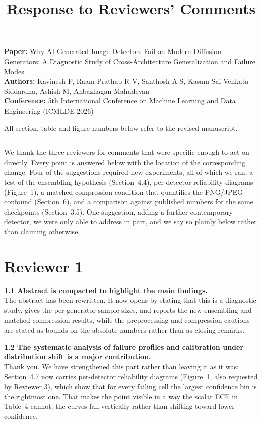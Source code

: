 \documentclass[11pt]{article}
\title{\vspace{-2.2em}Response to Reviewers' Comments}
\author{}
\date{}
\begin{document}
\maketitle
\vspace{-3.2em}

\noindent\textbf{Paper:} Why AI-Generated Image Detectors Fail on Modern
Diffusion Generators: A Diagnostic Study of Cross-Architecture
Generalization and Failure Modes\\
\textbf{Authors:} Kavinesh P, Raam Prathap R V, Santhosh A S, Kasam Sai
Venkata Siddardha, Ashish M, Anbazhagan Mahadevan\\
\textbf{Conference:} 5th International Conference on Machine Learning and
Data Engineering (ICMLDE 2026)

\vspace{6pt}
\noindent All section, table and figure numbers below refer to the revised
manuscript.

\vspace{4pt}
\hrule
\vspace{10pt}

We thank the three reviewers for comments that were specific enough to act
on directly. Every point is answered below with the location of the
corresponding change. Four of the suggestions required new experiments,
all of which we ran: a test of the ensembling hypothesis
(Section~4.4), per-detector reliability diagrams
(Figure~1), a matched-compression condition that
quantifies the PNG/JPEG confound (Section~6), and a
comparison against published numbers for the same checkpoints
(Section~3.5). One suggestion, adding a further
contemporary detector, we were only able to address in part, and we say so
plainly below rather than claiming otherwise.

\section*{Reviewer 1}

\noindent\textbf{1.1 Abstract is compacted to highlight the main findings.}\\[1pt]
The abstract has been rewritten. It now opens by stating that this is a
diagnostic study, gives the per-generator sample sizes, and reports the
new ensembling and matched-compression results, while the preprocessing
and compression cautions are stated as bounds on the absolute numbers
rather than as closing remarks.

\noindent\textbf{1.2 The systematic analysis of failure profiles and
calibration under distribution shift is a major contribution.}\\[1pt]
Thank you. We have strengthened this part rather than leaving it as it
was: Section~4.7 now carries per-detector reliability
diagrams (Figure~1, also requested by Reviewer 3),
which show that for every failing cell the largest confidence bin is the
rightmost one. That makes the point visible in a way the scalar ECE in
Table~4 cannot: the curves fall vertically rather than
shifting toward lower confidence.
\end{document}
